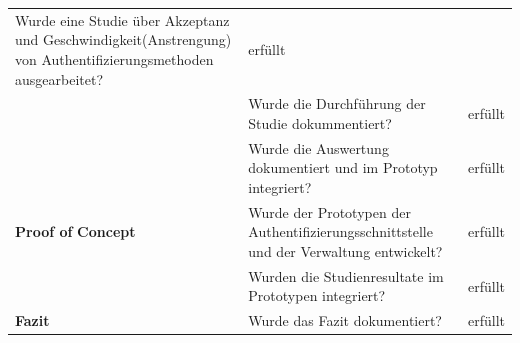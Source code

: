 \begin{longtable}[c]{@{}lll@{}}
\begin{minipage}[t]{0.68\columnwidth}
Wurde eine Studie über Akzeptanz und Geschwindigkeit(Anstrengung) von
Authentifizierungsmethoden ausgearbeitet?
\strut\end{minipage} &
\begin{minipage}[t]{0.09\columnwidth}\raggedright\strut
erfüllt
\strut\end{minipage}\tabularnewline
\begin{minipage}[t]{0.14\columnwidth}\raggedright\strut
\strut\end{minipage} &
\begin{minipage}[t]{0.68\columnwidth}\raggedright\strut
Wurde die Durchführung der Studie dokummentiert?
\strut\end{minipage} &
\begin{minipage}[t]{0.09\columnwidth}\raggedright\strut
erfüllt
\strut\end{minipage}\tabularnewline
\begin{minipage}[t]{0.14\columnwidth}\raggedright\strut
\strut\end{minipage} &
\begin{minipage}[t]{0.68\columnwidth}\raggedright\strut
Wurde die Auswertung dokumentiert und im Prototyp integriert?
\strut\end{minipage} &
\begin{minipage}[t]{0.09\columnwidth}\raggedright\strut
erfüllt
\strut\end{minipage}\tabularnewline
\begin{minipage}[t]{0.14\columnwidth}\raggedright\strut
\textbf{Proof of} \textbf{Concept}
\strut\end{minipage} &
\begin{minipage}[t]{0.68\columnwidth}\raggedright\strut
Wurde der Prototypen der Authentifizierungsschnittstelle und der
Verwaltung entwickelt?
\strut\end{minipage} &
\begin{minipage}[t]{0.09\columnwidth}\raggedright\strut
erfüllt
\strut\end{minipage}\tabularnewline
\begin{minipage}[t]{0.14\columnwidth}\raggedright\strut
\strut\end{minipage} &
\begin{minipage}[t]{0.68\columnwidth}\raggedright\strut
Wurden die Studienresultate im Prototypen integriert?
\strut\end{minipage} &
\begin{minipage}[t]{0.09\columnwidth}\raggedright\strut
erfüllt
\strut\end{minipage}\tabularnewline
\begin{minipage}[t]{0.14\columnwidth}\raggedright\strut
\textbf{Fazit}
\strut\end{minipage} &
\begin{minipage}[t]{0.68\columnwidth}\raggedright\strut
Wurde das Fazit dokumentiert?
\strut\end{minipage} &
\begin{minipage}[t]{0.09\columnwidth}\raggedright\strut
erfüllt
\strut\end{minipage}\tabularnewline
\bottomrule
\end{longtable}

